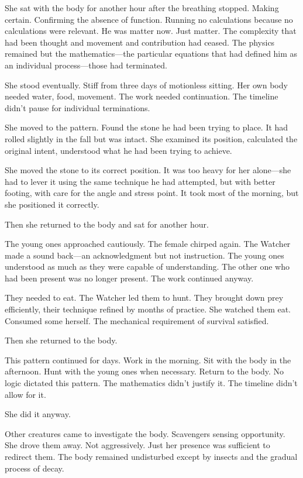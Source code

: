 She sat with the body for another hour after the breathing stopped. Making certain. Confirming the absence of function. Running no calculations because no calculations were relevant. He was matter now. Just matter. The complexity that had been thought and movement and contribution had ceased. The physics remained but the mathematics—the particular equations that had defined him as an individual process—those had terminated.

She stood eventually. Stiff from three days of motionless sitting. Her own body needed water, food, movement. The work needed continuation. The timeline didn't pause for individual terminations.

She moved to the pattern. Found the stone he had been trying to place. It had rolled slightly in the fall but was intact. She examined its position, calculated the original intent, understood what he had been trying to achieve.

She moved the stone to its correct position. It was too heavy for her alone—she had to lever it using the same technique he had attempted, but with better footing, with care for the angle and stress point. It took most of the morning, but she positioned it correctly.

Then she returned to the body and sat for another hour.

The young ones approached cautiously. The female chirped again. The Watcher made a sound back—an acknowledgment but not instruction. The young ones understood as much as they were capable of understanding. The other one who had been present was no longer present. The work continued anyway.

They needed to eat. The Watcher led them to hunt. They brought down prey efficiently, their technique refined by months of practice. She watched them eat. Consumed some herself. The mechanical requirement of survival satisfied.

Then she returned to the body.

This pattern continued for days. Work in the morning. Sit with the body in the afternoon. Hunt with the young ones when necessary. Return to the body. No logic dictated this pattern. The mathematics didn't justify it. The timeline didn't allow for it.

She did it anyway.

Other creatures came to investigate the body. Scavengers sensing opportunity. She drove them away. Not aggressively. Just her presence was sufficient to redirect them. The body remained undisturbed except by insects and the gradual process of decay.

